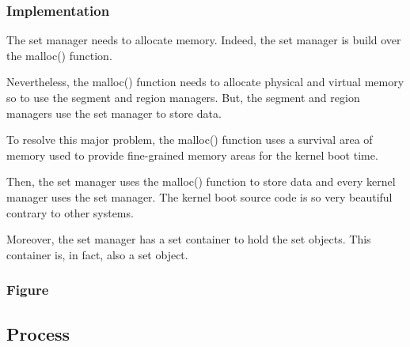 
\begin{frame}
  \frametitle{Implementation}

  The set manager needs to allocate memory. Indeed, the set manager
  is build over the malloc() function.

  \nl

  Nevertheless, the malloc() function needs to allocate physical and
  virtual memory so to use the segment and region managers. But, the
  segment and region managers use the set manager to store data.

  \nl

  To resolve this major problem, the malloc() function uses a survival area
  of memory used to provide fine-grained memory areas for the kernel
  boot time.

  \nl

  Then, the set manager uses the malloc() function to store data and
  every kernel manager uses the set manager. The kernel boot source code
  is so very beautiful contrary to other systems.

  \nl

  Moreover, the set manager has a set container to hold the set objects. This
  container is, in fact, also a set object.
\end{frame}


\begin{frame}
  \frametitle{Figure}

  \begin{center}
  \end{center}
\end{frame}

%
%

\subsection{Process}


